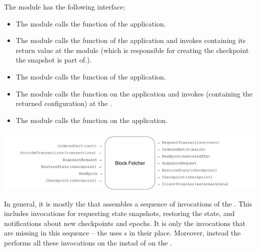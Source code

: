 \documentclass{article}
\begin{document}
The  module has the following interface:

\begin{itemize}

    \item {}
    The  module calls the  function of the application.

    \item {}
    The  module calls the  function of the application
    and invokes  containing its return value at the  module
    (which is responsible for creating the checkpoint the snapshot is part of.).

    \item {}
    The  module calls the  function of the application.

    \item {}
    The  module calls the  function on the application
    and invokes  (containing the returned configuration) at the .

    \item {}
    The  module calls the  function on the application.

\end{itemize}

\subsubsection{}

\includegraphics[width=\textwidth]{figures/modules/module-block-fetcher.pdf}

In general, it is mostly the  that assembles a sequence of invocations of the .
This includes invocations for requesting state snapshots, restoring the state, and notifications about new checkpoints and epochs.
It is only the  invocations that are missing in this sequence -- the  uses s in their place.
Moreover, instead the  performs all these invocations on the  instad of on the .
\end{document}
